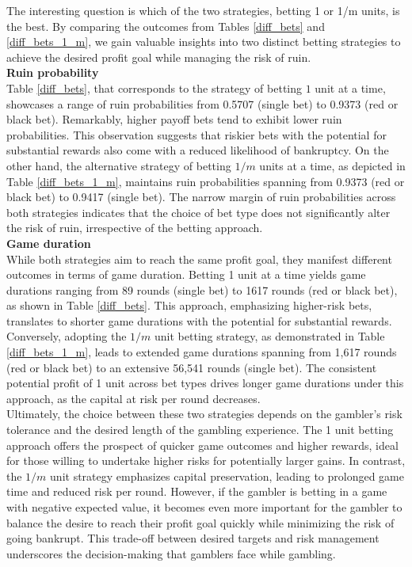 \documentclass[11pt,twoside]{article}
\numberwithin{Theorem}{section}
\numberwithin{Definition}{section}
\numberwithin{Lemma}{section}
\numberwithin{Algorithm}{section}
\numberwithin{equation}{section}
\begin{document}
The interesting question is which of the two strategies, betting 1 or 1/m units, is the best. By comparing the outcomes from Tables \ref{diff_bets} and \ref{diff_bets_1_m}, we gain valuable insights into two distinct betting strategies to achieve the desired profit goal while managing the risk of ruin.\\   

\textbf{Ruin probability}\\
Table \ref{diff_bets}, that corresponds to  the strategy of betting $1$ unit at a time, showcases a range of ruin probabilities from 0.5707 (single bet) to 0.9373 (red or black bet). Remarkably, higher payoff bets tend to exhibit lower ruin probabilities. This observation suggests that riskier bets with the potential for substantial rewards also come with a reduced likelihood of bankruptcy. On the other hand, the alternative strategy of betting $1/m$ units at a time, as depicted in Table \ref{diff_bets_1_m}, maintains ruin probabilities spanning from 0.9373 (red or black bet) to 0.9417 (single bet). The narrow margin of ruin probabilities across both strategies indicates that the choice of bet type does not significantly alter the risk of ruin, irrespective of the betting approach.\\

\textbf{Game duration}\\
While both strategies aim to reach the same profit goal, they manifest different outcomes in terms of game duration. Betting 1 unit at a time yields game durations ranging from 89 rounds (single bet) to 1617 rounds (red or black bet), as shown in Table \ref{diff_bets}. This approach, emphasizing higher-risk bets, translates to shorter game durations with the potential for substantial rewards. Conversely, adopting the $1/m$ unit betting strategy, as demonstrated in Table \ref{diff_bets_1_m}, leads to extended game durations spanning from 1,617 rounds (red or black bet) to an extensive 56,541 rounds (single bet). The consistent potential profit of 1 unit across bet types drives longer game durations under this approach, as the capital at risk per round decreases.\\

Ultimately, the choice between these two strategies depends on the gambler's risk tolerance and the desired length of the gambling experience. The 1 unit betting approach offers the prospect of quicker game outcomes and higher rewards, ideal for those willing to undertake higher risks for potentially larger gains. In contrast, the $1/m$ unit strategy emphasizes capital preservation, leading to prolonged game time and reduced risk per round. However, if the gambler is betting in a game with negative expected value, it becomes even more important for the gambler to balance the desire to reach their profit goal quickly while minimizing the risk of going bankrupt. This trade-off between desired targets and risk management underscores the decision-making that gamblers face while gambling.\\
\end{document}
